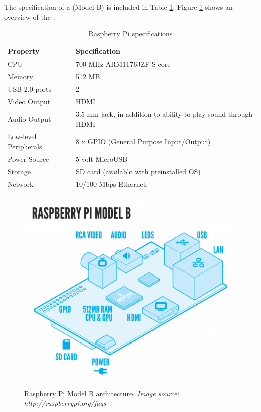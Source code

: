 The specification of a \rpi{} (Model B) is included in Table \ref{tab:pi-specs}. Figure \ref{fig:pi-arch-overview} shows an overview of the \rpi{}.        

\begin{table}
\begin{tabular}{|p{6.0cm} | p{6.0cm} |}
\hline 
\textbf{Property} & \textbf{Specification} \\
\hline
CPU & 700 MHz ARM1176JZF-S core \\
\hline
Memory & 512 MB \\
\hline
USB 2.0 ports & 2 \\
\hline
Video Output & HDMI \\
\hline
Audio Output & 3.5 mm jack, in addition to ability to play sound through HDMI \\
\hline
Low-level Peripherals & 8 x GPIO (General Purpose Input/Output) \\
\hline
Power Source & 5 volt MicroUSB \\
\hline
Storage & SD card (available with preinstalled OS) \\
\hline
Network & 10/100 Mbps Ethernet.  \\
\hline
\end{tabular}
\caption{Raspberry Pi specifications}
\label{tab:pi-specs}
\end{table}

\begin{figure}[H] 
	\centering
		\includegraphics[width=0.6\paperwidth]{Pictures/rpi-arch-overview.png}
	\caption{Raspberry Pi Model B architecture. \emph{Image source: http://raspberrypi.org/faqs} }
	\label{fig:pi-arch-overview}
\end{figure}
 

